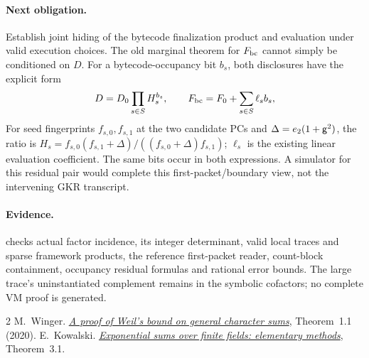 \documentclass[11pt]{article}
\begin{document}
\paragraph{Next obligation.} Establish joint hiding of the bytecode finalization product and evaluation under valid execution choices. The old marginal theorem for $F_{\rm bc}$ cannot simply be conditioned on $D$. For a bytecode-occupancy bit $b_s$, both disclosures have the explicit form
\[
 D=D_0\prod_{s\in S}H_s^{b_s},\qquad
 F_{\rm bc}=F_0+\sum_{s\in S}\ell_s b_s,
\]
For seed fingerprints $f_{s,0},f_{s,1}$ at the two candidate PCs and $\Delta=e_2(1+\mathsf{g}^2)$, the ratio is $H_s=f_{s,0}(f_{s,1}+\Delta)/((f_{s,0}+\Delta)f_{s,1})$; $\ell_s$ is the existing linear evaluation coefficient. The same bits occur in both expressions. A simulator for this residual pair would complete this first-packet/boundary view, not the intervening GKR transcript.

\paragraph{Evidence.}  checks actual factor incidence, its integer determinant, valid local traces and sparse framework products, the reference first-packet reader, count-block containment, occupancy residual formulas and rational error bounds. The large trace's uninstantiated complement remains in the symbolic cofactors; no complete VM proof is generated.

\begin{thebibliography}{2}
 M.~Winger. \href{https://people.math.ethz.ch/~pinkri/Theses/2020-Bachelor-Moritz-Winger.pdf}{\emph{A proof of Weil's bound on general character sums}}, Theorem~1.1 (2020).
 E.~Kowalski. \href{https://people.math.ethz.ch/~kowalski/exponential-sums-elementary.pdf}{\emph{Exponential sums over finite fields: elementary methods}}, Theorem~3.1.
\end{thebibliography}
\end{document}
